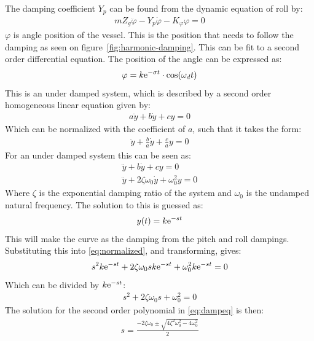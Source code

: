 The damping coefficient $Y_p$ can be found from the dynamic equation
of roll by: 
\begin{align}
mZ_g\ddot \varphi - Y_p\dot \varphi - K_\varphi \varphi = 0
\label{eq:solveddyneq}
\end{align}
$\varphi$ is angle position of the vessel. This is the position that needs to follow the damping as seen on figure~\vref{fig:harmonic-damping}. This can be fit to a second order differential equation. The position of the angle can be expressed as:
\begin{align}
\varphi = k\mathrm{e}^{-\sigma t} \cdot \cos(\omega_d t)
\label{eq:kestcoswt}
\end{align}
This is an under damped system, which is described by a second order
homogeneous linear equation given by:
\begin{align}
a\ddot y + b\dot y + cy = 0
\end{align}
Which can be normalized with the coefficient of $a$, such that it takes the form:
\begin{align}
\ddot y + \frac{b}{a}\dot y + \frac{c}{a}y = 0
\label{eq:parameterized}
\end{align}
For an under damped system this can be seen as:
\begin{align}
\ddot y + b\dot y + cy = 0\\
\ddot y + 2\zeta \omega_0 \dot y + \omega_0^2 y = 0
\label{eq:normalized}
\end{align}
Where $\zeta$ is the exponential damping ratio of the system and $\omega_0$ is the undamped natural frequency. The solution to this is guessed as:
\begin{align}
y(t) = k\mathrm{e}^{-st}
\label{eq:solutionguess}
\end{align}
This will make the curve as the damping from the pitch and roll dampings. Substituting this into \ref{eq:normalized}, and transforming, gives:
\begin{align}
s^2k\mathrm{e}^{-st} + 2\zeta \omega_0sk\mathrm{e}^{-st} + \omega_0^2k\mathrm{e}^{-st} = 0
\end{align}
Which can be divided by $k\mathrm{e}^{-st}$:
\begin{align}
s^2 + 2\zeta \omega_0s + \omega_0^2 = 0
\label{eq:dampeq}
\end{align}
The solution for the second order polynomial in \ref{eq:dampeq} is
then:
\begin{align}
s = \frac{-2\zeta \omega_0 \pm \sqrt{4\zeta^2\omega_0^2-4\omega_0^2}}{2}
\end{align}
